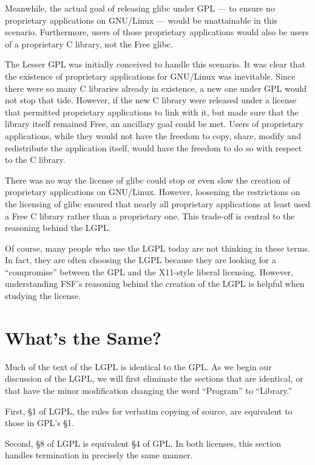 \documentclass[11pt, letterpaper]{book}
\begin{document}
Meanwhile, the actual goal of releasing glibc under GPL --- to ensure no
proprietary applications on GNU/Linux --- would be unattainable in this
scenario. Furthermore, users of those proprietary applications would also
be users of a proprietary C library, not the Free glibc.

The Lesser GPL was initially conceived to handle this scenario. It was
clear that the existence of proprietary applications for GNU/Linux was
inevitable. Since there were so many C libraries already in existence, a
new one under GPL would not stop that tide. However, if the new C library
were released under a license that permitted proprietary applications
to link with it, but made sure that the library itself remained Free,
an ancillary goal could be met. Users of proprietary applications, while
they would not have the freedom to copy, share, modify and redistribute
the application itself, would have the freedom to do so with respect to
the C library.

There was no way the license of glibc could stop or even slow the creation
of proprietary applications on GNU/Linux. However, loosening the
restrictions on the licensing of glibc ensured that nearly all proprietary
applications at least used a Free C library rather than a proprietary one.
This trade-off is central to the reasoning behind the LGPL\@.

Of course, many people who use the LGPL today are not thinking in these
terms. In fact, they are often choosing the LGPL because they are looking
for a ``compromise'' between the GPL and the X11-style liberal licensing.
However, understanding FSF's reasoning behind the creation of the LGPL is
helpful when studying the license.


\section{What's the Same?}

Much of the text of the LGPL is identical to the GPL\@. As we begin our
discussion of the LGPL, we will first eliminate the sections that are
identical, or that have the minor modification changing the word
``Program'' to ``Library.''

First, \S 1 of LGPL, the rules for verbatim copying of source, are
equivalent to those in GPL's \S 1.

Second, \S 8 of LGPL is equivalent \S 4 of GPL\@. In both licenses, this
section handles termination in precisely the same manner.
\end{document}
